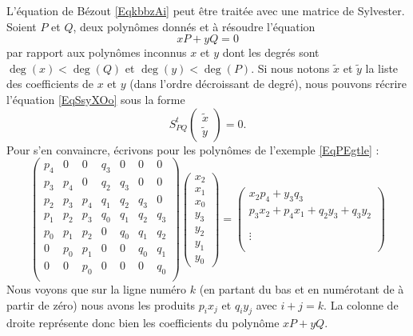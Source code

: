 L'équation de Bézout \eqref{EqkbbzAi} peut être traitée avec une matrice de Sylvester. Soient \( P\) et \( Q\), deux polynômes donnés et à résoudre l'équation
\begin{equation}    \label{EqSsyXOo}
	xP+yQ=0
\end{equation}
par rapport aux polynômes inconnus \( x\) et \( y\) dont les degrés sont \( \deg(x)<\deg(Q)\) et \( \deg(y)<\deg(P)\). Si nous notons \( \tilde x\) et \( \tilde y\) la liste des coefficients de \( x\) et \( y\) (dans l'ordre décroissant de degré), nous pouvons récrire l'équation \eqref{EqSsyXOo} sous la forme
\begin{equation}
	S_{PQ}^t\begin{pmatrix}
		\tilde x \\
		\tilde y
	\end{pmatrix}=0.
\end{equation}
Pour s'en convaincre, écrivons pour les polynômes de l'exemple \eqref{EqPEgtle} :
\begin{equation}
	\begin{pmatrix}
		p_4 & 0   & 0   & q_3 & 0   & 0   & 0   \\
		p_3 & p_4 & 0   & q_2 & q_3 & 0   & 0   \\
		p_2 & p_3 & p_4 & q_1 & q_2 & q_3 & 0   \\
		p_1 & p_2 & p_3 & q_0 & q_1 & q_2 & q_3 \\
		p_0 & p_1 & p_2 & 0   & q_0 & q_1 & q_2 \\
		0   & p_0 & p_1 & 0   & 0   & q_0 & q_1 \\
		0   & 0   & p_0 & 0   & 0   & 0   & q_0 \\
	\end{pmatrix}\begin{pmatrix}
		x_2 \\
		x_1 \\
		x_0 \\
		y_3 \\
		y_2 \\
		y_1 \\
		y_0
	\end{pmatrix}=
	\begin{pmatrix}
		x_2p_4+y_3q_3               \\
		p_3x_2+p_4x_1+q_2y_3+q_3y_2 \\
		\\
		\\
		\vdots                      \\
		\\
	\end{pmatrix}
\end{equation}
Nous voyons que sur la ligne numéro \( k\) (en partant du bas et en numérotant de à partir de zéro) nous avons les produits \( p_ix_j\) et \( q_iy_j\) avec \( i+j=k\). La colonne de droite représente donc bien les coefficients du polynôme \( xP+yQ\).


